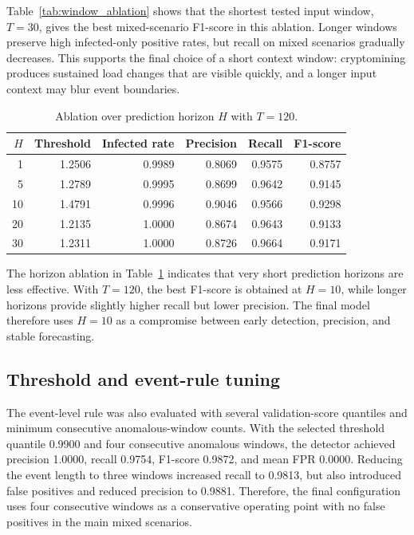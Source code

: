\documentclass[a4paper,12pt]{extarticle}
\begin{document}
Table~\ref{tab:window_ablation} shows that the shortest tested input window, $T=30$, gives the best mixed-scenario F1-score in this ablation. Longer windows preserve high infected-only positive rates, but recall on mixed scenarios gradually decreases. This supports the final choice of a short context window: cryptomining produces sustained load changes that are visible quickly, and a longer input context may blur event boundaries.

\begin{table}[H]
\caption{Ablation over prediction horizon $H$ with $T=120$.}
\label{tab:horizon_ablation}
\centering
\small
\begin{tabular}{rrrrrr}
\toprule
$H$ & Threshold & Infected rate & Precision & Recall & F1-score \\
\midrule
1 & 1.2506 & 0.9989 & 0.8069 & 0.9575 & 0.8757 \\
5 & 1.2789 & 0.9995 & 0.8699 & 0.9642 & 0.9145 \\
10 & 1.4791 & 0.9996 & 0.9046 & 0.9566 & 0.9298 \\
20 & 1.2135 & 1.0000 & 0.8674 & 0.9643 & 0.9133 \\
30 & 1.2311 & 1.0000 & 0.8726 & 0.9664 & 0.9171 \\
\bottomrule
\end{tabular}
\end{table}

The horizon ablation in Table~\ref{tab:horizon_ablation} indicates that very short prediction horizons are less effective. With $T=120$, the best F1-score is obtained at $H=10$, while longer horizons provide slightly higher recall but lower precision. The final model therefore uses $H=10$ as a compromise between early detection, precision, and stable forecasting.

\subsection{Threshold and event-rule tuning}

The event-level rule was also evaluated with several validation-score quantiles and minimum consecutive anomalous-window counts. With the selected threshold quantile 0.9900 and four consecutive anomalous windows, the detector achieved precision 1.0000, recall 0.9754, F1-score 0.9872, and mean FPR 0.0000. Reducing the event length to three windows increased recall to 0.9813, but also introduced false positives and reduced precision to 0.9881. Therefore, the final configuration uses four consecutive windows as a conservative operating point with no false positives in the main mixed scenarios.
\end{document}
